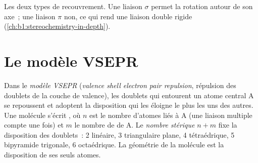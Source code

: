 \begin{omfigure}

{\small Les deux types de recouvrement. Une liaison $\sigma$ permet la
rotation autour de son axe~; une liaison $\pi$ non, ce qui rend une
liaison double rigide (\cref{ch:b1:stereochemistry-in-depth}).}
\end{omfigure}

\section{Le modèle VSEPR}

\begin{definition}\label{def:b1:lewis-resonance-vsepr:vsepr}
Dans le \emph{modèle VSEPR} (\textit{valence shell electron pair
repulsion}, répulsion des doublets de la couche de valence), les doublets
qui entourent un atome central A se repoussent et adoptent la
disposition qui les éloigne le plus les uns des autres. Une molécule
s'écrit , où $n$ est le nombre d'atomes liés à A (une
liaison multiple compte une fois) et $m$ le nombre de  de A. Le \emph{nombre stérique} $n + m$ fixe la disposition des
doublets~: 2 linéaire, 3 triangulaire plane, 4 tétraédrique, 5
bipyramide trigonale, 6 octaédrique. La géométrie de la molécule est la
disposition de ses seuls atomes.
\end{definition}

